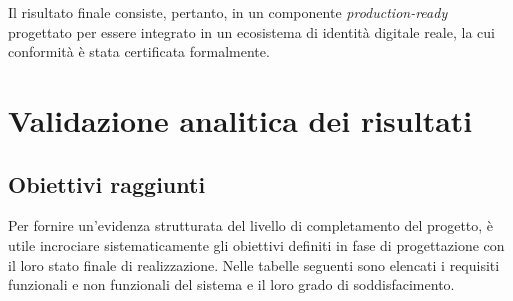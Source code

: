 Il risultato finale consiste, pertanto, in un componente \textit{production-ready} progettato per essere integrato in un ecosistema di identità digitale reale, la cui conformità è stata certificata formalmente.

\section{Validazione analitica dei risultati}

\subsection{Obiettivi raggiunti}
Per fornire un'evidenza strutturata del livello di completamento del progetto, è utile incrociare sistematicamente gli obiettivi definiti in fase di progettazione con il loro stato finale di realizzazione. Nelle tabelle seguenti sono elencati i requisiti funzionali e non funzionali del sistema e il loro grado di soddisfacimento.

